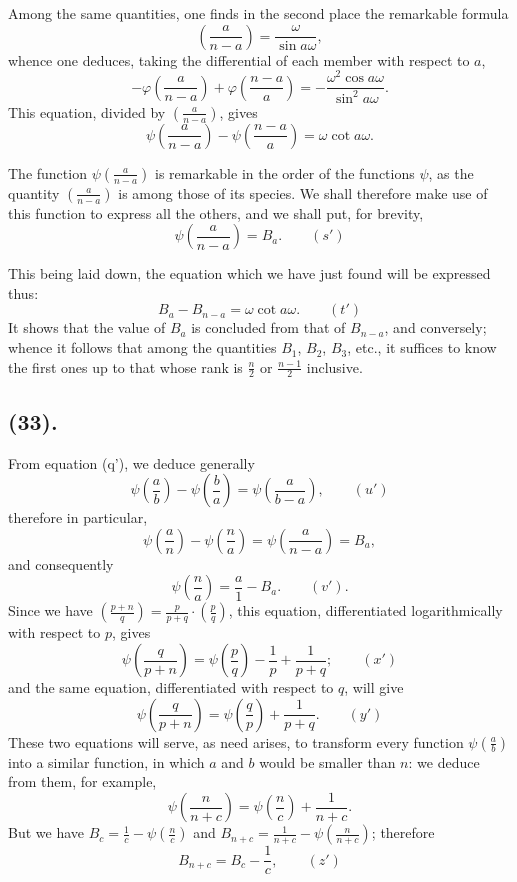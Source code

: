 \documentclass{article}
\begin{document}
Among the same quantities, one finds in the second place the remarkable formula
\[ \left(\frac{a}{n-a}\right)=\frac{\omega}{\sin a\omega}, \]
whence one deduces, taking the differential of each member with respect to $a$,
\[ -\varphi\left(\frac{a}{n-a}\right)+\varphi\left(\frac{n-a}{a}\right)=-\frac{\omega^{2}\cos a\omega}{\sin^{2}a\omega}. \]
This equation, divided by $\left(\frac{a}{n-a}\right)$, gives
\[ \psi\left(\frac{a}{n-a}\right)-\psi\left(\frac{n-a}{a}\right)=\omega\cot a\omega. \]

The function $\psi\left(\frac{a}{n-a}\right)$ is remarkable in the order of the functions $\psi$, as the quantity $\left(\frac{a}{n-a}\right)$ is among those of its species. We shall therefore make use of this function to express all the others, and we shall put, for brevity,
\[ \psi\left(\frac{a}{n-a}\right)=B_{a}.\qquad(s') \]

This being laid down, the equation which we have just found will be expressed thus:
\[ B_{a}-B_{n-a}=\omega\cot a\omega.\qquad(t') \]
It shows that the value of $B_{a}$ is concluded from that of $B_{n-a}$, and conversely; whence it follows that among the quantities $B_{1}$, $B_{2}$, $B_{3}$, etc., it suffices to know the first ones up to that whose rank is $\frac{n}{2}$ or $\frac{n-1}{2}$ inclusive.

\subsection*{(33).}

From equation (q'), we deduce generally
\[ \psi\left(\frac{a}{b}\right)-\psi\left(\frac{b}{a}\right)=\psi\left(\frac{a}{b-a}\right),\qquad(u') \]
therefore in particular,
\[ \psi\left(\frac{a}{n}\right)-\psi\left(\frac{n}{a}\right)=\psi\left(\frac{a}{n-a}\right)=B_{a}, \]
and consequently
\[ \psi\left(\frac{n}{a}\right)=\frac{a}{1}-B_{a}.\qquad(v'). \]
Since we have $\left(\frac{p+n}{q}\right)=\frac{p}{p+q}\cdot\left(\frac{p}{q}\right)$, this equation, differentiated logarithmically with respect to $p$, gives
\[ \psi\left(\frac{q}{p+n}\right)=\psi\left(\frac{p}{q}\right)-\frac{1}{p}+\frac{1}{p+q};\qquad(x') \]
and the same equation, differentiated with respect to $q$, will give
\[ \psi\left(\frac{q}{p+n}\right)=\psi\left(\frac{q}{p}\right)+\frac{1}{p+q}.\qquad(y') \]
These two equations will serve, as need arises, to transform every function $\psi\left(\frac{a}{b}\right)$ into a similar function, in which $a$ and $b$ would be smaller than $n$: we deduce from them, for example,
\[ \psi\left(\frac{n}{n+c}\right)=\psi\left(\frac{n}{c}\right)+\frac{1}{n+c}. \]
But we have $B_{c}=\frac{1}{c}-\psi\left(\frac{n}{c}\right)$ and $B_{n+c}=\frac{1}{n+c}-\psi\left(\frac{n}{n+c}\right)$; therefore
\[ B_{n+c}=B_{c}-\frac{1}{c},\qquad(z') \]
\end{document}
